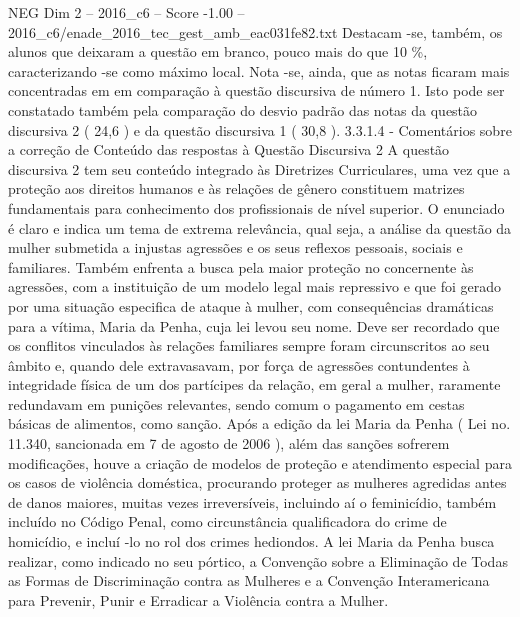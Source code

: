 \begin{textsample}{NEG Dim 2 – 2016\_c6 – Score -1.00 – 2016\_c6/enade\_2016\_tec\_gest\_amb\_eac031fe82.txt}
Destacam -se, também, os alunos que deixaram a questão em branco, pouco mais do que 10 \%, caracterizando -se como máximo local.
Nota -se, ainda, que as notas ficaram mais concentradas em em comparação à questão discursiva de número 1.
Isto pode ser constatado também pela comparação do desvio padrão das notas da questão discursiva 2 ( 24,6 ) e da questão discursiva 1 ( 30,8 ). 3.3.1.4 - Comentários sobre a correção de Conteúdo das respostas à Questão Discursiva 2 A questão discursiva 2 tem seu conteúdo integrado às Diretrizes Curriculares, uma vez que a proteção aos direitos humanos e às relações de gênero constituem matrizes fundamentais para conhecimento dos profissionais de nível superior.
O enunciado é claro e indica um tema de extrema relevância, qual seja, a análise da questão da mulher submetida a injustas agressões e os seus reflexos pessoais, sociais e familiares.
Também enfrenta a busca pela maior proteção no concernente às agressões, com a instituição de um modelo legal mais repressivo e que foi gerado por uma situação especifica de ataque à mulher, com consequências dramáticas para a vítima, Maria da Penha, cuja lei levou seu nome.
Deve ser recordado que os conflitos vinculados às relações familiares sempre foram circunscritos ao seu âmbito e, quando dele extravasavam, por força de agressões contundentes à integridade física de um dos partícipes da relação, em geral a mulher, raramente redundavam em punições relevantes, sendo comum o pagamento em cestas básicas de alimentos, como sanção.
Após a edição da lei Maria da Penha ( Lei no. 11.340, sancionada em 7 de agosto de 2006 ), além das sanções sofrerem modificações, houve a criação de modelos de proteção e atendimento especial para os casos de violência doméstica, procurando proteger as mulheres agredidas antes de danos maiores, muitas vezes irreversíveis, incluindo aí o feminicídio, também incluído no Código Penal, como circunstância qualificadora do crime de homicídio, e incluí -lo no rol dos crimes hediondos.
A lei Maria da Penha busca realizar, como indicado no seu pórtico, a Convenção sobre a Eliminação de Todas as Formas de Discriminação contra as Mulheres e a Convenção Interamericana para Prevenir, Punir e Erradicar a Violência contra a Mulher.

\end{textsample}

